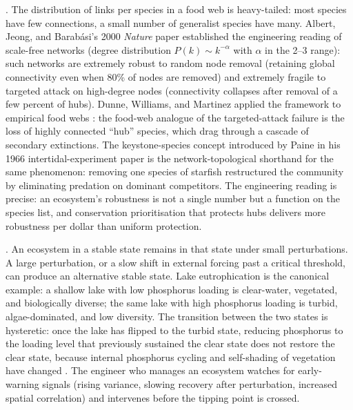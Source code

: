 . The
distribution of links per species in a food web is heavy-tailed:
most species have few connections, a small number of generalist
species have many. Albert, Jeong, and Barab{\'a}si's 2000
\emph{Nature} paper \cite[pp.~378--382]{paper:v6c08-albert-barabasi-2000}
established the engineering reading of scale-free networks (degree
distribution $P(k) \sim k^{-\alpha}$ with $\alpha$ in the 2--3
range): such networks are extremely robust to random node removal
(retaining global connectivity even when 80\% of nodes are removed)
and extremely fragile to targeted attack on high-degree nodes
(connectivity collapses after removal of a few percent of hubs).
Dunne, Williams, and Martinez applied the framework to empirical
food webs \cite[pp.~558--567]{paper:v6c08-dunne-foodweb-2002}: the
food-web analogue of the targeted-attack failure is the loss of
highly connected ``hub'' species, which drag through a cascade of
secondary extinctions. The keystone-species concept introduced by
Paine in his 1966 intertidal-experiment paper
\cite[pp.~65--75]{paper:v6c08-paine-1966} is the network-topological
shorthand for the same phenomenon: removing one species of starfish
restructured the community by eliminating predation on dominant
competitors. The engineering reading is precise: an ecosystem's
robustness is not a single number but a function on the species
list, and conservation prioritisation that protects hubs delivers
more robustness per dollar than uniform protection.

. An ecosystem in a stable
state remains in that state under small perturbations. A large
perturbation, or a slow shift in external forcing past a critical
threshold, can produce an alternative stable state. Lake eutrophication
is the canonical example: a shallow lake with low phosphorus loading
is clear-water, vegetated, and biologically diverse; the same lake
with high phosphorus loading is turbid, algae-dominated, and low
diversity. The transition between the two states is hysteretic: once
the lake has flipped to the turbid state, reducing phosphorus to the
loading level that previously sustained the clear state does not
restore the clear state, because internal phosphorus cycling and
self-shading of vegetation have changed
\cite[ch.~5]{text:v6c08-scheffer-shifts}. The engineer who manages an
ecosystem watches for early-warning signals (rising variance, slowing
recovery after perturbation, increased spatial correlation) and
intervenes before the tipping point is crossed.

